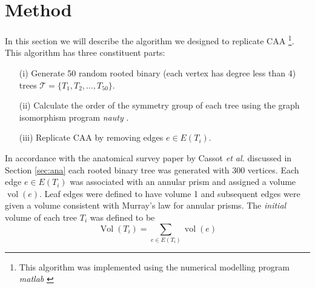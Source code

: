 \documentclass[12pt]{article} %
\theoremstyle{definition}
\DeclareMathOperator{\vol}{vol}
\DeclareMathOperator{\Vol}{Vol}
\begin{document}


\section{Method}\label{sec:meth}

In this section we will describe the algorithm we designed to replicate CAA \footnote{This algorithm was implemented using the numerical modelling program \emph{matlab} \cite{matlab}}.  This algorithm has three constituent parts:
\begin{itemize}
\item[(i)] Generate 50 random rooted binary (each vertex has degree less than 4) trees $\mathcal{T} = \{ T_1,T_2,\dots,T_{50}\}$.
\item[(ii)]Calculate the order of the symmetry group of each tree using the graph isomorphism program \emph{nauty} \cite{nauty}.
\item[(iii)] Replicate CAA by removing edges $e \in E(T_i)$. %
\end{itemize} 

In accordance with the anatomical survey paper by Cassot \emph{et al.} discussed in Section \ref{sec:ana} each rooted binary tree was generated with $300$ vertices.  Each edge $e \in E(T_i)$ was associated with an annular prism and assigned a volume $\vol(e)$.   Leaf  edges were defined to have volume 1 and subsequent edges were given a volume consistent with Murray's law for annular prisms.  The \emph{initial} volume of each tree $T_i$ was defined to be 
\[\Vol(T_i) =  \sum_{e \in E(T_i)} \vol(e)\]
\end{document}
